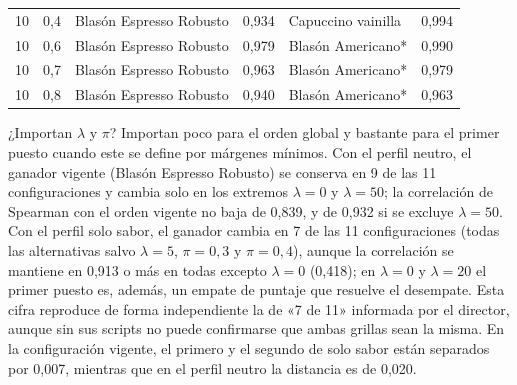 \begin{table}[htbp]
\begin{tabular}{rrlrlr}
{\color{blue}10} & {\color{blue}0,4} & {\color{blue}Blasón Espresso Robusto} & {\color{blue}0,934} & {\color{blue}Capuccino vainilla} & {\color{blue}0,994} \\
{\color{blue}10} & {\color{blue}0,6} & {\color{blue}Blasón Espresso Robusto} & {\color{blue}0,979} & {\color{blue}Blasón Americano*} & {\color{blue}0,990} \\
{\color{blue}10} & {\color{blue}0,7} & {\color{blue}Blasón Espresso Robusto} & {\color{blue}0,963} & {\color{blue}Blasón Americano*} & {\color{blue}0,979} \\
{\color{blue}10} & {\color{blue}0,8} & {\color{blue}Blasón Espresso Robusto} & {\color{blue}0,940} & {\color{blue}Blasón Americano*} & {\color{blue}0,963} \\
\bottomrule
\end{tabular}
\end{table}

¿Importan $\lambda$ y $\pi$? Importan poco para el orden global y bastante para el primer puesto cuando este se define por márgenes mínimos. Con el perfil neutro, el ganador vigente (Blasón Espresso Robusto) se conserva en 9 de las 11 configuraciones y cambia solo en los extremos $\lambda=0$ y $\lambda=50$; la correlación de Spearman con el orden vigente no baja de 0,839, y de 0,932 si se excluye $\lambda=50$. Con el perfil solo sabor, el ganador cambia en 7 de las 11 configuraciones (todas las alternativas salvo $\lambda=5$, $\pi=0{,}3$ y $\pi=0{,}4$), aunque la correlación se mantiene en 0,913 o más en todas excepto $\lambda=0$ (0,418); en $\lambda=0$ y $\lambda=20$ el primer puesto es, además, un empate de puntaje que resuelve el desempate. Esta cifra reproduce de forma independiente la de «7 de 11» informada por el director, aunque sin sus scripts no puede confirmarse que ambas grillas sean la misma. En la configuración vigente, el primero y el segundo de solo sabor están separados por 0,007, mientras que en el perfil neutro la distancia es de 0,020.\par
\endgroup
